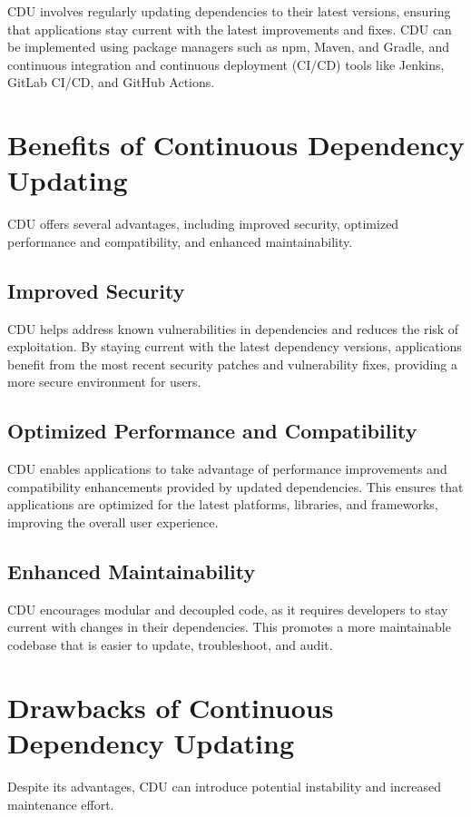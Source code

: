 \documentclass[10pt]{article}
\begin{document}
CDU involves regularly updating dependencies to their latest versions, ensuring that applications stay current with the latest improvements and fixes. CDU can be implemented using package managers such as npm, Maven, and Gradle, and continuous integration and continuous deployment (CI/CD) tools like Jenkins, GitLab CI/CD, and GitHub Actions.

\section{Benefits of Continuous Dependency Updating}
CDU offers several advantages, including improved security, optimized performance and compatibility, and enhanced maintainability.

\subsection{Improved Security}
CDU helps address known vulnerabilities in dependencies and reduces the risk of exploitation. By staying current with the latest dependency versions, applications benefit from the most recent security patches and vulnerability fixes, providing a more secure environment for users.

\subsection{Optimized Performance and Compatibility}
CDU enables applications to take advantage of performance improvements and compatibility enhancements provided by updated dependencies. This ensures that applications are optimized for the latest platforms, libraries, and frameworks, improving the overall user experience.

\subsection{Enhanced Maintainability}
CDU encourages modular and decoupled code, as it requires developers to stay current with changes in their dependencies. This promotes a more maintainable codebase that is easier to update, troubleshoot, and audit.

\section{Drawbacks of Continuous Dependency Updating}
Despite its advantages, CDU can introduce potential instability and increased maintenance effort.
\end{document}
